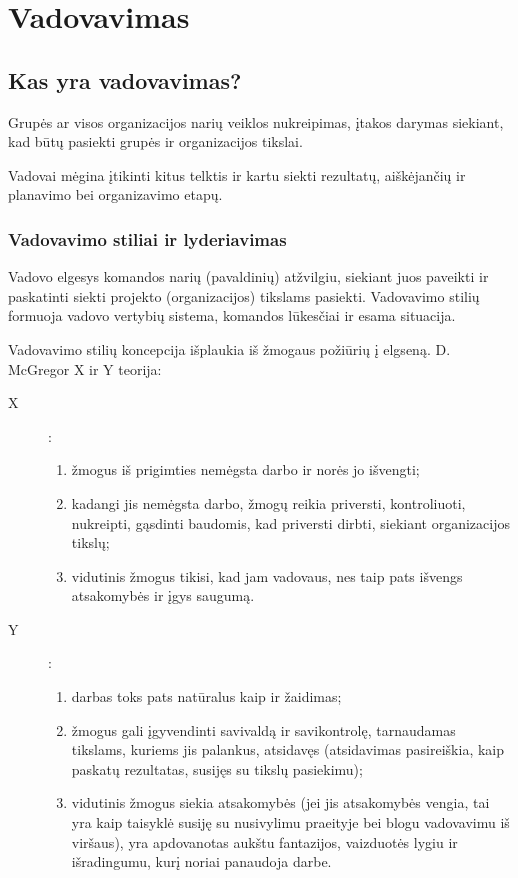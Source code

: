 \chapter{Vadovavimas}

\section{Kas yra vadovavimas?}

\begin{defn}[Vadovavimas]
  Grupės ar visos organizacijos narių veiklos nukreipimas, įtakos
  darymas siekiant, kad būtų pasiekti grupės ir organizacijos tikslai.
\end{defn}

Vadovai mėgina įtikinti kitus telktis ir kartu siekti rezultatų,
aiškėjančių ir planavimo bei organizavimo etapų.

\subsection{Vadovavimo stiliai ir lyderiavimas}

\begin{defn}
  Vadovo elgesys komandos narių (pavaldinių) atžvilgiu, siekiant juos
  paveikti ir paskatinti siekti projekto (organizacijos) tikslams
  pasiekti. Vadovavimo stilių formuoja vadovo vertybių sistema,
  komandos lūkesčiai ir esama situacija.
\end{defn}

Vadovavimo stilių koncepcija išplaukia iš žmogaus požiūrių į elgseną.
D. McGregor X ir Y teorija:
\begin{description}
  \item[X]:
    \begin{enumerate}
      \item žmogus iš prigimties nemėgsta darbo ir norės jo išvengti;
      \item kadangi jis nemėgsta darbo, žmogų reikia priversti,
        kontroliuoti, nukreipti, gąsdinti baudomis, kad priversti
        dirbti, siekiant organizacijos tikslų;
      \item vidutinis žmogus tikisi, kad jam vadovaus, nes taip pats
        išvengs atsakomybės ir įgys saugumą.
    \end{enumerate}
  \item[Y]:
    \begin{enumerate}
      \item darbas toks pats natūralus kaip ir žaidimas;
      \item žmogus gali įgyvendinti savivaldą ir savikontrolę,
        tarnaudamas tikslams, kuriems jis palankus, atsidavęs
        (atsidavimas pasireiškia, kaip paskatų rezultatas, susijęs
        su tikslų pasiekimu);
      \item vidutinis žmogus siekia atsakomybės (jei jis atsakomybės
        vengia, tai yra kaip taisyklė susiję su nusivylimu praeityje
        bei blogu vadovavimu iš viršaus), yra apdovanotas aukštu
        fantazijos, vaizduotės lygiu ir išradingumu, kurį noriai
        panaudoja darbe.
    \end{enumerate}
\end{description}


